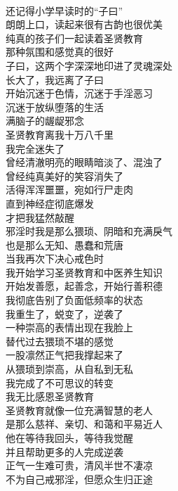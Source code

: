 \begin{poem}[从猥琐到崇高]
    \begin{multicols}{2}
        \centering~\\
        还记得小学早读时的“子曰” \\ 朗朗上口，读起来很有古韵也很优美 \\ 纯真的孩子们一起读着圣贤教育 \\ 那种氛围和感觉真的很好 \\ 子曰，这两个字深深地印进了灵魂深处 \\ 长大了，我远离了子曰 \\ 开始沉迷于色情，沉迷于手淫恶习 \\ 沉迷于放纵堕落的生活 \\ 满脑子的龌龊邪念 \\ 圣贤教育离我十万八千里 \\ 我完全迷失了 \\ 曾经清澈明亮的眼睛暗淡了、混浊了 \\ 曾经纯真美好的笑容消失了 \\ 活得浑浑噩噩，宛如行尸走肉 \\ 直到神经症彻底爆发 \\ 才把我猛然敲醒 \\ 邪淫时我是那么猥琐、阴暗和充满戾气 \\ 也是那么无知、愚蠢和荒唐 \\ 当我再次下决心戒色时 \\ 我开始学习圣贤教育和中医养生知识 \\ 开始发善愿，起善念，开始行善积德 \\ 我彻底告别了负面低频率的状态 \\ 我重生了，蜕变了，逆袭了 \\ 一种崇高的表情出现在我脸上 \\ 替代过去猥琐不堪的感觉 \\ 一股凛然正气把我撑起来了 \\ 从猥琐到崇高，从自私到无私 \\ 我完成了不可思议的转变 \\ 我无比感恩圣贤教育 \\ 圣贤教育就像一位充满智慧的老人 \\ 是那么慈祥、亲切、和蔼和平易近人 \\ 他在等待我回头，等待我觉醒 \\ 并且帮助更多的人完成逆袭 \\ 正气一生难可贵，清风半世不凄凉 \\ 不为自己戒邪淫，但愿众生归正途
    \end{multicols}
\end{poem}

